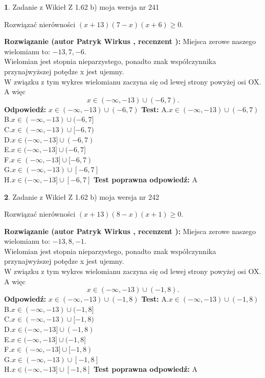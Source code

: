 \documentclass[12pt, a4paper]{article}
\theoremstyle{definition} %
\newtheorem{zad}{}
\newcommand{\zadStart}[1]{\begin{zad}#1\newline}
\newcommand{\zadStop}{\end{zad}}
\newcommand{\rozwStart}[2]{\noindent \textbf{Rozwiązanie (autor #1 , recenzent #2): }\newline}
\newcommand{\rozwStop}{\newline}
\newcommand{\odpStart}{\noindent \textbf{Odpowiedź:}\newline}
\newcommand{\odpStop}{\newline}
\newcommand{\testStart}{\noindent \textbf{Test:}\newline}
\newcommand{\testStop}{\newline}
\newcommand{\kluczStart}{\noindent \textbf{Test poprawna odpowiedź:}\newline}
\newcommand{\kluczStop}{\newline}
\begin{document}
\zadStart{Zadanie z Wikieł Z 1.62 b) moja wersja nr 241}

Rozwiązać nierówności $(x+13)(7-x)(x+6)\ge0$.
\zadStop
\rozwStart{Patryk Wirkus}{}
Miejsca zerowe naszego wielomianu to: $-13, 7, -6$.\\
Wielomian jest stopnia nieparzystego, ponadto znak współczynnika przy\linebreak najwyższej potędze x jest ujemny.\\ W związku z tym wykres wielomianu zaczyna się od lewej strony powyżej osi OX. A więc $$x \in (-\infty,-13) \cup (-6,7).$$
\rozwStop
\odpStart
$x \in (-\infty,-13) \cup (-6,7)$
\odpStop
\testStart
A.$x \in (-\infty,-13) \cup (-6,7)$\\
B.$x \in (-\infty,-13) \cup (-6,7]$\\
C.$x \in (-\infty,-13) \cup [-6,7)$\\
D.$x \in (-\infty,-13] \cup (-6,7)$\\
E.$x \in (-\infty,-13] \cup (-6,7]$\\
F.$x \in (-\infty,-13] \cup [-6,7)$\\
G.$x \in (-\infty,-13) \cup [-6,7]$\\
H.$x \in (-\infty,-13] \cup [-6,7]$
\testStop
\kluczStart
A
\kluczStop



\zadStart{Zadanie z Wikieł Z 1.62 b) moja wersja nr 242}

Rozwiązać nierówności $(x+13)(8-x)(x+1)\ge0$.
\zadStop
\rozwStart{Patryk Wirkus}{}
Miejsca zerowe naszego wielomianu to: $-13, 8, -1$.\\
Wielomian jest stopnia nieparzystego, ponadto znak współczynnika przy\linebreak najwyższej potędze x jest ujemny.\\ W związku z tym wykres wielomianu zaczyna się od lewej strony powyżej osi OX. A więc $$x \in (-\infty,-13) \cup (-1,8).$$
\rozwStop
\odpStart
$x \in (-\infty,-13) \cup (-1,8)$
\odpStop
\testStart
A.$x \in (-\infty,-13) \cup (-1,8)$\\
B.$x \in (-\infty,-13) \cup (-1,8]$\\
C.$x \in (-\infty,-13) \cup [-1,8)$\\
D.$x \in (-\infty,-13] \cup (-1,8)$\\
E.$x \in (-\infty,-13] \cup (-1,8]$\\
F.$x \in (-\infty,-13] \cup [-1,8)$\\
G.$x \in (-\infty,-13) \cup [-1,8]$\\
H.$x \in (-\infty,-13] \cup [-1,8]$
\testStop
\kluczStart
A
\kluczStop
\end{document}
